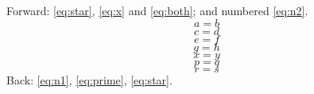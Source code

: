 \documentclass{article}
\begin{document}
Forward: \eqref{eq:star}, \eqref{eq:x} and \ref{eq:both}; and numbered \eqref{eq:n2}.
\begin{equation}
a = b \label{eq:n1}
\end{equation}
\begin{equation}
c = d \tag{1a} \label{eq:x}
\end{equation}
\begin{equation}
\label{eq:both} e = f \tag{A}
\end{equation}
\begin{equation*}
g = h \tag{3'} \label{eq:prime}
\end{equation*}
\[
x = y \tag*{[Eq. 7]}
\]
\[
p = q \tag*{(star)} \label{eq:star}
\]
\begin{equation}
r = s \label{eq:n2}
\end{equation}
Back: \eqref{eq:n1}, \eqref{eq:prime}, \ref{eq:star}.
\end{document}
